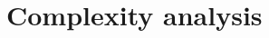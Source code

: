 \documentclass[thesis.tex]{subfiles}
\begin{document}
\chapter{Complexity analysis}
\label{sec:complexity_analysis}
\end{document}
